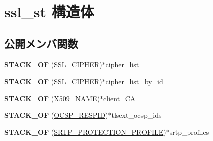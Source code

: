 \hypertarget{structssl__st}{}\section{ssl\+\_\+st 構造体}
\label{structssl__st}
\subsection*{公開メンバ関数}
\begin{DoxyCompactItemize}
\item 
\hypertarget{structssl__st_a5ae7275d4f26447455746397ac00232c}{}{\bfseries S\+T\+A\+C\+K\+\_\+\+O\+F} (\hyperlink{structssl__cipher__st}{S\+S\+L\+\_\+\+C\+I\+P\+H\+E\+R})$\ast$cipher\+\_\+list\label{structssl__st_a5ae7275d4f26447455746397ac00232c}

\item 
\hypertarget{structssl__st_ae926fcbe52e4174a9e5ef8fb88282e45}{}{\bfseries S\+T\+A\+C\+K\+\_\+\+O\+F} (\hyperlink{structssl__cipher__st}{S\+S\+L\+\_\+\+C\+I\+P\+H\+E\+R})$\ast$cipher\+\_\+list\+\_\+by\+\_\+id\label{structssl__st_ae926fcbe52e4174a9e5ef8fb88282e45}

\item 
\hypertarget{structssl__st_a3e6334502ba71000f571d6ddb26b76c5}{}{\bfseries S\+T\+A\+C\+K\+\_\+\+O\+F} (\hyperlink{struct_x509__name__st}{X509\+\_\+\+N\+A\+M\+E})$\ast$client\+\_\+\+C\+A\label{structssl__st_a3e6334502ba71000f571d6ddb26b76c5}

\item 
\hypertarget{structssl__st_acc0a36a4a42e6846ece423336c62ffce}{}{\bfseries S\+T\+A\+C\+K\+\_\+\+O\+F} (\hyperlink{structocsp__responder__id__st}{O\+C\+S\+P\+\_\+\+R\+E\+S\+P\+I\+D})$\ast$tlsext\+\_\+ocsp\+\_\+ids\label{structssl__st_acc0a36a4a42e6846ece423336c62ffce}

\item 
\hypertarget{structssl__st_aae6ff6d8a9ae850b7ea3f90fad7b0e5e}{}{\bfseries S\+T\+A\+C\+K\+\_\+\+O\+F} (\hyperlink{structsrtp__protection__profile__st}{S\+R\+T\+P\+\_\+\+P\+R\+O\+T\+E\+C\+T\+I\+O\+N\+\_\+\+P\+R\+O\+F\+I\+L\+E})$\ast$srtp\+\_\+profiles\label{structssl__st_aae6ff6d8a9ae850b7ea3f90fad7b0e5e}

\end{DoxyCompactItemize}

